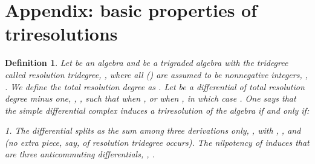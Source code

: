 \documentclass[a4paper,12pt]{article}
\newtheorem{definition}{Definition}
\begin{document}
\appendix 

\section{Appendix: basic properties of triresolutions}

\begin{definition}
Let \coordHE{} be an algebra and \coordHE{} be a
trigraded algebra with the tridegree called resolution tridegree, \coordHE{},
where all \coordHE{} (\coordHE{}) are assumed to be nonnegative
integers, \coordHE{}, \coordHE{}. We define the total
resolution degree as \coordHE{}. Let \coordHE{} be a differential of total resolution degree minus one, \coordHE{}, \coordHE{}, such that \coordHE{} when \coordHE{}, or \coordHE{} when \coordHE{}, in which case \coordHE{}. One says that the simple
differential complex \coordHE{} induces
a triresolution \coordHE{} of the algebra \coordHE{} if and only if:

1. The differential \myHighlight{$\delta $}\coordHE{} splits as the sum among three derivations
only, \coordHE{}, with \coordHE{}, \coordHE{}, and \coordHE{} (no extra piece, say, of
resolution tridegree \coordHE{} occurs). The nilpotency of \myHighlight{$%
\delta $}\coordHE{} induces that \coordHE{} are three
anticommuting differentials, \coordHE{}, \coordHE{}.


\end{definition}
\end{document}
